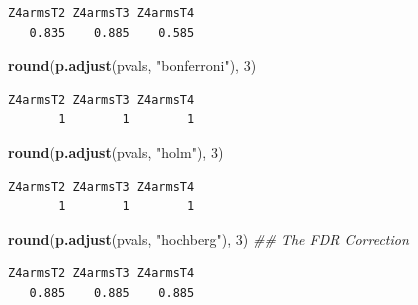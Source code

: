 \documentclass[
  12pt,
]{book}
\newenvironment{Shaded}{\begin{snugshade}}{\end{snugshade}}
\newcommand{\CommentTok}[1]{\textcolor[rgb]{0.56,0.35,0.01}{\textit{#1}}}
\newcommand{\DecValTok}[1]{\textcolor[rgb]{0.00,0.00,0.81}{#1}}
\newcommand{\KeywordTok}[1]{\textcolor[rgb]{0.13,0.29,0.53}{\textbf{#1}}}
\newcommand{\NormalTok}[1]{#1}
\newcommand{\OperatorTok}[1]{\textcolor[rgb]{0.81,0.36,0.00}{\textbf{#1}}}
\newcommand{\StringTok}[1]{\textcolor[rgb]{0.31,0.60,0.02}{#1}}
\theoremstyle{definition}
\theoremstyle{definition}
\theoremstyle{definition}
\theoremstyle{remark}
\begin{document}
\begin{Shaded}
\end{Shaded}

\begin{verbatim}
Z4armsT2 Z4armsT3 Z4armsT4 
   0.835    0.885    0.585 
\end{verbatim}

\begin{Shaded}
\begin{Highlighting}[]
\KeywordTok{round}\NormalTok{(}\KeywordTok{p.adjust}\NormalTok{(pvals, }\StringTok{"bonferroni"}\NormalTok{), }\DecValTok{3}\NormalTok{)}
\end{Highlighting}
\end{Shaded}

\begin{verbatim}
Z4armsT2 Z4armsT3 Z4armsT4 
       1        1        1 
\end{verbatim}

\begin{Shaded}
\begin{Highlighting}[]
\KeywordTok{round}\NormalTok{(}\KeywordTok{p.adjust}\NormalTok{(pvals, }\StringTok{"holm"}\NormalTok{), }\DecValTok{3}\NormalTok{)}
\end{Highlighting}
\end{Shaded}

\begin{verbatim}
Z4armsT2 Z4armsT3 Z4armsT4 
       1        1        1 
\end{verbatim}

\begin{Shaded}
\begin{Highlighting}[]
\KeywordTok{round}\NormalTok{(}\KeywordTok{p.adjust}\NormalTok{(pvals, }\StringTok{"hochberg"}\NormalTok{), }\DecValTok{3}\NormalTok{) }\CommentTok{## The  FDR Correction}
\end{Highlighting}
\end{Shaded}

\begin{verbatim}
Z4armsT2 Z4armsT3 Z4armsT4 
   0.885    0.885    0.885 
\end{verbatim}
\end{document}
